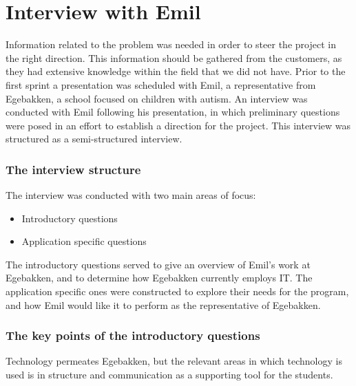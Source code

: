 \section{Interview with Emil}\label{interview-with-emil}
Information related to the problem was needed in order to steer the project in the right direction.
This information should be gathered from the customers, as they had extensive knowledge within the field that we did not have.
Prior to the first sprint a presentation was scheduled with Emil, a representative from Egebakken, a school focused on children with autism.
An interview was conducted with Emil following his presentation, in which preliminary questions were posed in an effort to establish a direction for the project.
This interview was structured as a semi-structured interview.

\subsubsection{The interview structure}
The interview was conducted with two main areas of focus:
\begin{itemize}
    \item Introductory questions
    \item Application specific questions
\end{itemize}
\noindent
The introductory questions served to give an overview of Emil's work at Egebakken, and to determine how Egebakken currently employs IT.
The application specific ones were constructed to explore their needs for the program, and how Emil would like it to perform as the representative of Egebakken.

\subsubsection{The key points of the introductory questions}
Technology permeates Egebakken, but the relevant areas in which technology is used is in structure and communication as a supporting tool for the students.

